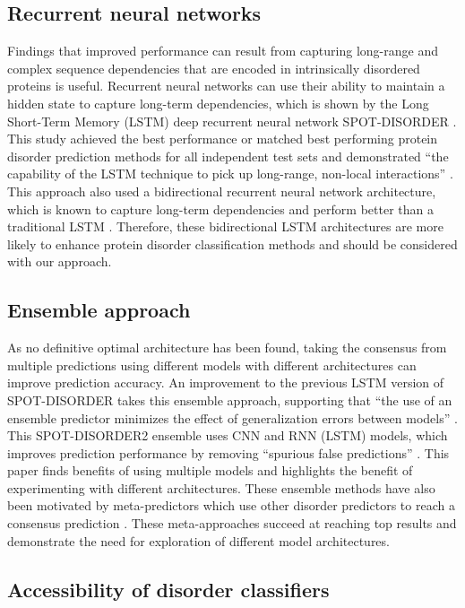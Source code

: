 \documentclass{l4proj}
\begin{document}
\subsection{Recurrent neural networks}

Findings that improved performance can result from capturing long-range and complex sequence dependencies that are encoded in intrinsically disordered proteins is useful. Recurrent neural networks can use their ability to maintain a hidden state to capture long-term dependencies, which is shown by the Long Short-Term Memory (LSTM) deep recurrent neural network SPOT-DISORDER \citep{Hanson:16}. This study achieved the best performance or matched best performing protein disorder prediction methods for all independent test sets and demonstrated “the capability of the LSTM technique to pick up long-range, non-local interactions” \citep{Hanson:16}. This approach also used a bidirectional recurrent neural network architecture, which is known to capture long-term dependencies and perform better than a traditional LSTM \citep{Graves:05}. Therefore, these bidirectional LSTM architectures are more likely to enhance protein disorder classification methods and should be considered with our approach.

\subsection{Ensemble approach}

As no definitive optimal architecture has been found, taking the consensus from multiple predictions using different models with different architectures can improve prediction accuracy. An improvement to the previous LSTM version of SPOT-DISORDER takes this ensemble approach, supporting that “the use of an ensemble predictor minimizes the effect of generalization errors between models” \citep{spot_disorder_2}. This SPOT-DISORDER2 ensemble uses CNN and RNN (LSTM) models, which improves prediction performance by removing “spurious false predictions” \citep{spot_disorder_2}. This paper finds benefits of using multiple models and highlights the benefit of experimenting with different architectures. These ensemble methods have also been motivated by meta-predictors which use other disorder predictors to reach a consensus prediction \citep{Emenecker:21}. These meta-approaches succeed at reaching top results and demonstrate the need for exploration of different model architectures.

\subsection{Accessibility of disorder classifiers}
\end{document}
